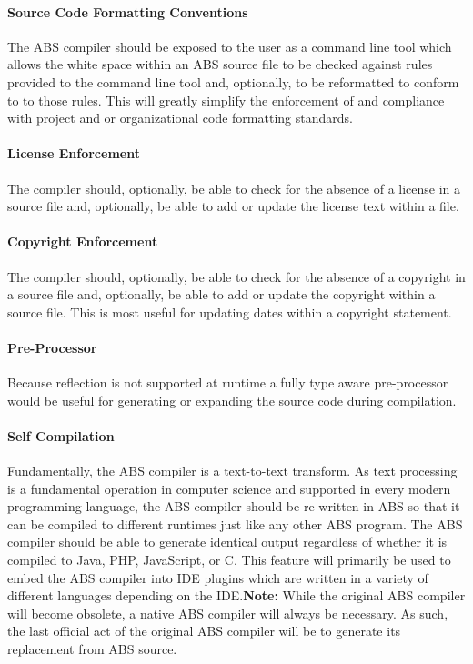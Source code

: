 \documentclass[hidelinks]{article}
\begin{document}
\paragraph{Source Code Formatting Conventions}
The ABS compiler should be exposed to the user as a command line tool which allows the white space within an ABS source file to be checked against rules provided to the command line tool and, optionally, to be reformatted to conform to to those rules. This will greatly simplify the enforcement of and compliance with project and or organizational code formatting standards.
\paragraph{License Enforcement}
The compiler should, optionally, be able to check for the absence of a license in a source file and, optionally, be able to add or update the license text within a file.
\paragraph{Copyright Enforcement}
The compiler should, optionally, be able to check for the absence of a copyright in a source file and, optionally, be able to add or update the copyright within a source file. This is most useful for updating dates within a copyright statement.
\paragraph{Pre-Processor}
Because reflection is not supported at runtime a fully type aware pre-processor would be useful for generating or expanding the source code during compilation.
\paragraph{Self Compilation}
Fundamentally, the ABS compiler is a text-to-text transform. As text processing is a fundamental operation in computer science and supported in every modern programming language, the ABS compiler should be re-written in ABS so that it can be compiled to different runtimes just like any other ABS program. The ABS compiler should be able to generate identical output regardless of whether it is compiled to Java, PHP, JavaScript, or C. This feature will primarily be used to embed the ABS compiler into IDE plugins which are written in a variety of different languages depending on the IDE.\linebreak\linebreak\textbf{Note:} While the original ABS compiler will become obsolete, a native ABS compiler will always be necessary. As such, the last official act of the original ABS compiler will be to generate its replacement from ABS source.
\end{document}
